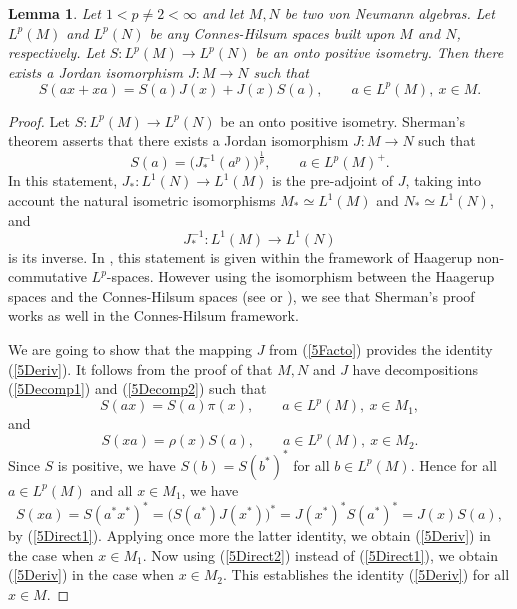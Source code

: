\documentclass[12pt]{amsart}
\newtheorem{lemma}[theorem]{Lemma}
\theoremstyle{remark}
\theoremstyle{definition}
\numberwithin{equation}{section}
\begin{document}
\begin{lemma}\label{5J}
Let $1<p\not=2<\infty$ and let $M,N$ be two von Neumann algebras. Let
$L^p(M)$ and $L^p(N)$ be any Connes-Hilsum spaces built upon $M$ and $N$, respectively.
Let $S\colon L^p(M)\to L^p(N)$ be an onto positive isometry.
Then there exists a Jordan isomorphism $J\colon M\to N$
such that 
\begin{equation}\label{5Deriv}
S(ax+xa) =S(a)J(x) + J(x)S(a),\qquad a\in L^p(M),\  x\in M.
\end{equation}  
\end{lemma}





 
\begin{proof}
Let $S\colon L^p(M)\to L^p(N)$ be an onto positive isometry.
Sherman's theorem \cite[Theorem 1.2]{Sh} asserts that there exists 
a Jordan isomorphism $J\colon M\to N$
such that 
\begin{equation}\label{5Facto}
S(a)= \bigl(J^{-1}_*(a^p)\bigr)^{\frac{1}{p}},\qquad a\in L^p(M)^+.
\end{equation}
In this statement, $J_*\colon L^1(N)\to L^1(M)$ is the pre-adjoint of $J$,
taking into account the natural isometric isomorphisms
$M_*\simeq L^1(M)$ and $N_*\simeq L^1(N)$, and 
$$
J^{-1}_*\colon L^1(M)\longrightarrow L^1(N)
$$
is its inverse. In \cite{Sh,Sh2}, this statement is given within the framework
of Haagerup non-commutative $L^p$-spaces. However using the isomorphism
between the Haagerup spaces and the Connes-Hilsum spaces (see
\cite[Chapter IV]{Terp0} or \cite[Section 11.3]{Hiai}), we see that 
Sherman's proof works as well in the Connes-Hilsum framework.

We are going to show that the mapping $J$ from (\ref{5Facto}) provides
the identity (\ref{5Deriv}).
It follows from the proof of \cite[Theorem 1.2]{Sh} that $M,N$ and $J$
have decompositions (\ref{5Decomp1}) and (\ref{5Decomp2}) such that
\begin{equation}\label{5Direct1}
S(ax) = S(a)\pi(x),\qquad a\in L^p(M),\ x\in M_1,
\end{equation}
and
\begin{equation}\label{5Direct2}
S(xa) = \rho(x)S(a),\qquad a\in L^p(M),\ x\in M_2.
\end{equation}
Since $S$ is positive, we have $S(b)=S(b^*)^*$ for all 
$b\in L^p(M)$. Hence for all $a\in L^p(M)$ and
all $x\in M_1$, we  have 
$$
S(xa) = S(a^*x^*)^* = \bigl(S(a^*)J(x^*)\bigr)^*= J(x^*)^*S(a^*)^*= J(x)S(a),
$$
by (\ref{5Direct1}). Applying once more  the latter identity, we obtain (\ref{5Deriv}) in
the case when $x\in M_1$. Now using  (\ref{5Direct2}) instead of  (\ref{5Direct1}),
we obtain  (\ref{5Deriv}) in
the case when $x\in M_2$. This establishes the identity  (\ref{5Deriv}) for all $x\in M$.
\end{proof}
\end{document}
